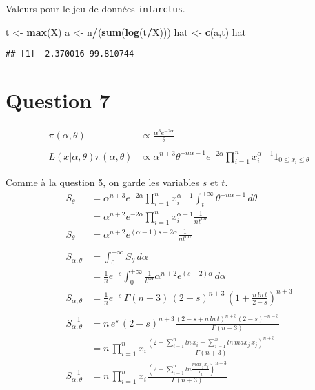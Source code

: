\documentclass[
  12pt,
]{scrreprt}
\newenvironment{Shaded}{\begin{snugshade}}{\end{snugshade}}
\newcommand{\KeywordTok}[1]{\textcolor[rgb]{0.13,0.29,0.53}{\textbf{#1}}}
\newcommand{\NormalTok}[1]{#1}
\newcommand{\OperatorTok}[1]{\textcolor[rgb]{0.81,0.36,0.00}{\textbf{#1}}}
\newcommand{\StringTok}[1]{\textcolor[rgb]{0.31,0.60,0.02}{#1}}
\begin{document}
Valeurs pour le jeu de données \texttt{infarctus}.

\begin{Shaded}
\begin{Highlighting}[]
\NormalTok{t <-}\StringTok{ }\KeywordTok{max}\NormalTok{(X)}
\NormalTok{a <-}\StringTok{ }\NormalTok{n}\OperatorTok{/}\NormalTok{(}\KeywordTok{sum}\NormalTok{(}\KeywordTok{log}\NormalTok{(t}\OperatorTok{/}\NormalTok{X)))}
\NormalTok{hat <-}\StringTok{ }\KeywordTok{c}\NormalTok{(a,t)}
\NormalTok{hat}
\end{Highlighting}
\end{Shaded}

\begin{verbatim}
## [1]  2.370016 99.810744
\end{verbatim}

\hypertarget{question-7}{%
\section{Question 7}\label{question-7}}

\[\begin{aligned}
\pi(\alpha,\theta) &\propto \frac{\alpha^3 e^{-2\alpha}}{\theta}\\
&\\
L(x|\alpha,\theta)\pi(\alpha,\theta) &\propto \alpha^{n+3}\theta^{-n\alpha-1}e^{-2\alpha}\prod_{i=1}^n x_i^{\alpha-1}{1}_{0 \leq x_i \leq \theta}
\end{aligned}\]

Comme à la \protect\hyperlink{ux5cux23ux5cux2520Questionux5cux25205}{question 5}, on garde les variables \(s\) et \(t\).
\[\begin{aligned}
S_{\theta} &= \alpha^{n+3} e^{-2\alpha} \prod_{i=1}^n x_i^{\alpha-1}\int_t^{+\infty}\theta^{-n\alpha-1}\,d\theta\\
&=\alpha^{n+2}e^{-2\alpha}\prod_{i=1}^n x_i^{\alpha-1}\frac{1}{nt^{n\alpha}}\\
S_{\theta}&=\alpha^{n+2}e^{(\alpha-1)s - 2\alpha}\frac{1}{nt^{n\alpha}}\\
&\\
S_{\alpha,\theta} &= \int_0^{+\infty}S_\theta\, d\alpha\\
&=\frac{1}{n}e^{-s} \int_0^{+\infty} \frac{1}{t^{n\alpha}}\alpha^{n+2}e^{(s-2)\alpha}\,d\alpha\\
S_{\alpha,\theta} &= \frac{1}{n}e^{-s}\,\Gamma(n+3)\,(2-s)^{n+3}\,\left(1+\frac{n\,ln\,t}{2-s} \right )^{n+3}\\
&\\
S_{\alpha,\theta}^{-1} &= n\,e^s\,(2-s)^{n+3}\frac{(2-s+n\,ln\,t)^{n+3}(2-s)^{-n-3}}{\Gamma(n+3)}\\
&= n\,\prod_{i=1}^n x_i \frac{\left(2-\sum_{i=1}^n ln\,x_i-\sum_{i=1}^nln\,max_j\,x_j\right)^{n+3}}{\Gamma(n+3)}\\
S_{\alpha,\theta}^{-1} &= n\,\prod_{i=1}^n x_i \frac{\left(2+\sum_{i=1}^n ln\frac{max_j\,x_j}{x_i}\right)^{n+3}}{\Gamma(n+3)}
\end{aligned}\]
\end{document}

